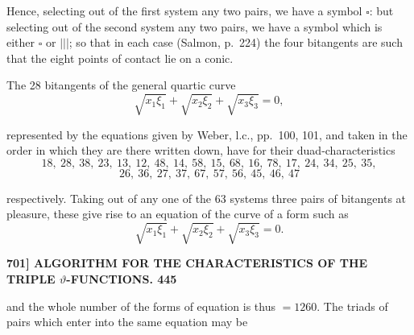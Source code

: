 \documentclass[11pt]{article}
\begin{document}
\medskip

Hence, selecting out of the first system any two pairs, we have a symbol $\square$: but selecting out of the second system any two pairs, we have a symbol which is either $\square$ or $|||$; so that in each case (Salmon, p.~224) the four bitangents are such that the eight points of contact lie on a conic.

\medskip

The 28 bitangents of the general quartic curve
\[
\sqrt{x_1\xi_1} + \sqrt{x_2\xi_2} + \sqrt{x_3\xi_3} = 0,
\]

represented by the equations given by Weber, l.c., pp.~100, 101, and taken in the order in which they are there written down, have for their duad-characteristics
\[
18,\ 28,\ 38,\ 23,\ 13,\ 12,\ 48,\ 14,\ 58,\ 15,\ 68,\ 16,\ 78,\ 17,\ 24,\ 34,\ 25,\ 35,
\]
\[
26,\ 36,\ 27,\ 37,\ 67,\ 57,\ 56,\ 45,\ 46,\ 47
\]

respectively. Taking out of any one of the 63 systems three pairs of bitangents at pleasure, these give rise to an equation of the curve of a form such as
\[
\sqrt{x_1\xi_1} + \sqrt{x_2\xi_2} + \sqrt{x_3\xi_3} = 0.
\]

\bigskip
\noindent\textbf{701] \quad ALGORITHM FOR THE CHARACTERISTICS OF THE TRIPLE $\vartheta$-FUNCTIONS. \hfill 445}

\medskip

and the whole number of the forms of equation is thus $=1260$. The triads of pairs which enter into the same equation may be

\medskip
\end{document}
